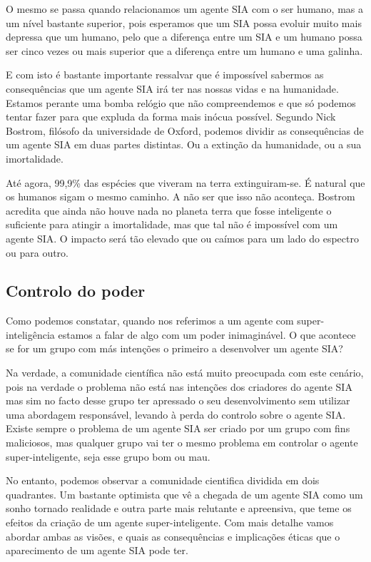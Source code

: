 \documentclass[runningheads,a4paper]{llncs}
\begin{document}
O mesmo se passa quando relacionamos um agente SIA com o ser humano, mas a um nível bastante superior, pois esperamos que um SIA possa evoluir muito mais depressa que um humano, pelo que a diferença entre um SIA e um humano possa ser cinco vezes ou mais superior que a diferença entre um humano e uma galinha.

E com isto é bastante importante ressalvar que é impossível sabermos as consequências que um agente SIA irá ter nas nossas vidas e na humanidade. Estamos perante uma bomba relógio que não compreendemos e que só podemos tentar fazer para que expluda da forma mais inócua possível. Segundo Nick Bostrom, filósofo da universidade de Oxford, podemos dividir as consequências de um agente SIA em duas partes distintas. Ou a extinção da humanidade, ou a sua imortalidade.

Até agora, 99,9\% das espécies que viveram na terra extinguiram-se. É natural que os humanos sigam o mesmo caminho. A não ser que isso não aconteça. Bostrom acredita que ainda não houve nada no planeta terra que fosse inteligente o suficiente para atingir a imortalidade, mas que tal não é impossível com um agente SIA\@. O impacto será tão elevado que ou caímos para um lado do espectro ou para outro.

\subsection{Controlo do poder}

Como podemos constatar, quando nos referimos a um agente com super-inteligência estamos a falar de algo com um poder inimaginável. O que acontece se for um grupo com más intenções o primeiro a desenvolver um agente SIA?\@

Na verdade, a comunidade científica não está muito preocupada com este cenário, pois na verdade o problema não está nas intenções dos criadores do agente SIA mas sim no facto desse grupo ter apressado o seu desenvolvimento sem utilizar uma abordagem responsável, levando à perda do controlo sobre o agente SIA\@. Existe sempre o problema de um agente SIA ser criado por um grupo com fins maliciosos, mas qualquer grupo vai ter o mesmo problema em controlar o agente super-inteligente, seja esse grupo bom ou mau.

No entanto, podemos observar a comunidade cientifica dividida em dois quadrantes. Um bastante optimista que vê a chegada de um agente SIA como um sonho tornado realidade e outra parte mais relutante e apreensiva, que teme os efeitos da criação de um agente super-inteligente. Com mais detalhe vamos abordar ambas as visões, e quais as consequências e implicações éticas que o aparecimento de um agente SIA pode ter.
\end{document}
